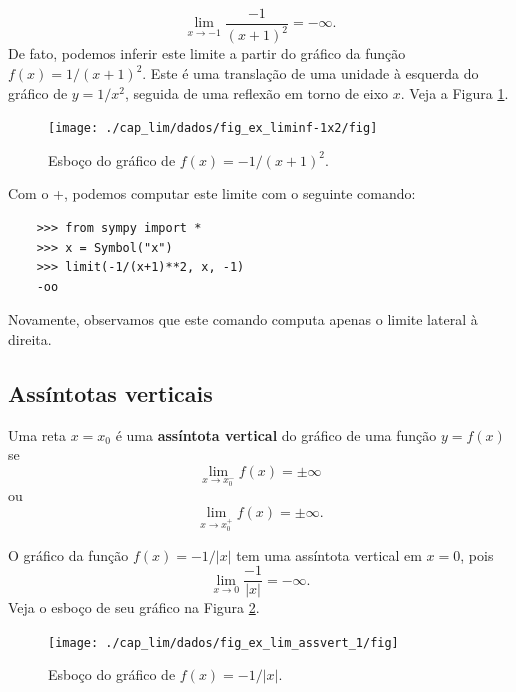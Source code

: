 \begin{ex}
  \begin{equation}
    \lim_{x\to -1} \frac{-1}{(x+1)^2} = -\infty.
  \end{equation}
  De fato, podemos inferir este limite a partir do gráfico da função $f(x) = 1/(x+1)^2$. Este é uma translação de uma unidade à esquerda do gráfico de $y = 1/x^2$, seguida de uma reflexão em torno de eixo $x$. Veja a Figura \ref{fig:ex_liminf-1x2}.

  \begin{figure}[H]
    \centering
    \texttt{[image: ./cap\_lim/dados/fig\_ex\_liminf-1x2/fig]}
    \caption{Esboço do gráfico de $f(x)=-1/(x+1)^2$.}
    \label{fig:ex_liminf-1x2}
  \end{figure}

  Com o {\python}+{\sympy}, podemos computar este limite com o seguinte comando:
  
  \begin{lstlisting}
    >>> from sympy import *
    >>> x = Symbol("x")
    >>> limit(-1/(x+1)**2, x, -1)
    -oo
  \end{lstlisting}
  
  Novamente, observamos que este comando computa apenas o limite lateral à direita.

\end{ex}

\subsection{Assíntotas verticais}

Uma reta $x=x_0$ é uma {\bf assíntota vertical} do gráfico de uma função $y = f(x)$ se
\begin{equation}
  \lim_{x\to x_0^-} f(x) = \pm\infty
\end{equation}
ou
\begin{equation}
  \lim_{x\to x_0^+} f(x) = \pm\infty.
\end{equation}

\begin{ex}
  O gráfico da função $f(x)=-1/|x|$ tem uma assíntota vertical em $x=0$, pois
  \begin{equation}
    \lim_{x\to 0} \frac{-1}{|x|} = -\infty.
  \end{equation}
  Veja o esboço de seu gráfico na Figura \ref{fig:ex_lim_assvert_1}.

  \begin{figure}[H]
    \centering
    \texttt{[image: ./cap\_lim/dados/fig\_ex\_lim\_assvert\_1/fig]}
    \caption{Esboço do gráfico de $f(x)=-1/|x|$.}
    \label{fig:ex_lim_assvert_1}
  \end{figure}  
\end{ex}

